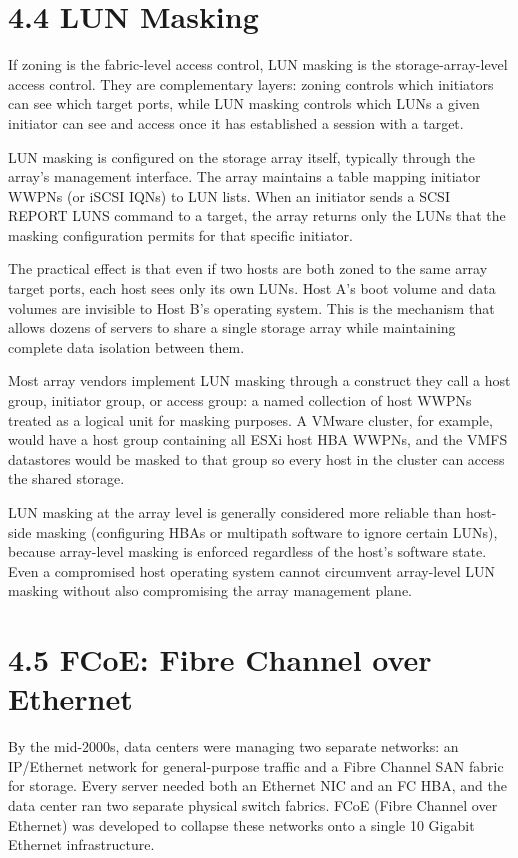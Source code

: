 \section{4.4 LUN Masking}
If zoning is the fabric-level access control, LUN masking is the storage-array-level access control. They are complementary layers: zoning controls which initiators can see which target ports, while LUN masking controls which LUNs a given initiator can see and access once it has established a session with a target.

LUN masking is configured on the storage array itself, typically through the array's management interface. The array maintains a table mapping initiator WWPNs (or iSCSI IQNs) to LUN lists. When an initiator sends a SCSI REPORT LUNS command to a target, the array returns only the LUNs that the masking configuration permits for that specific initiator.

The practical effect is that even if two hosts are both zoned to the same array target ports, each host sees only its own LUNs. Host A's boot volume and data volumes are invisible to Host B's operating system. This is the mechanism that allows dozens of servers to share a single storage array while maintaining complete data isolation between them.

Most array vendors implement LUN masking through a construct they call a host group, initiator group, or access group: a named collection of host WWPNs treated as a logical unit for masking purposes. A VMware cluster, for example, would have a host group containing all ESXi host HBA WWPNs, and the VMFS datastores would be masked to that group so every host in the cluster can access the shared storage.

LUN masking at the array level is generally considered more reliable than host-side masking (configuring HBAs or multipath software to ignore certain LUNs), because array-level masking is enforced regardless of the host's software state. Even a compromised host operating system cannot circumvent array-level LUN masking without also compromising the array management plane.

\section{4.5 FCoE: Fibre Channel over Ethernet}
By the mid-2000s, data centers were managing two separate networks: an IP/Ethernet network for general-purpose traffic and a Fibre Channel SAN fabric for storage. Every server needed both an Ethernet NIC and an FC HBA, and the data center ran two separate physical switch fabrics. FCoE (Fibre Channel over Ethernet) was developed to collapse these networks onto a single 10 Gigabit Ethernet infrastructure.

